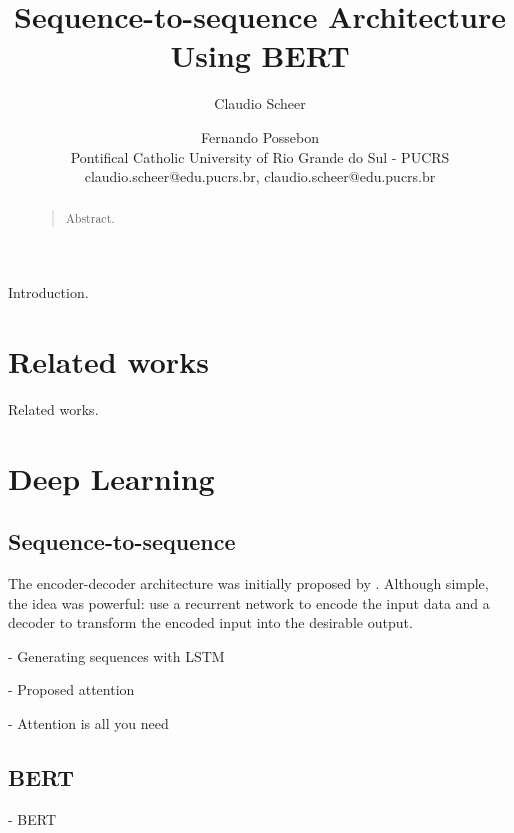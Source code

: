 \documentclass[letterpaper]{article}
\begin{document}
%
\title{Sequence-to-sequence Architecture\\Using BERT}
\author{Claudio Scheer \and Fernando Possebon\\
    Pontifical Catholic University of Rio Grande do Sul - PUCRS\\
    claudio.scheer@edu.pucrs.br,
    claudio.scheer@edu.pucrs.br
}

\maketitle

\begin{abstract}
\begin{quote}
Abstract.
\end{quote}
\end{abstract}

\noindent Introduction.


\section{Related works}
Related works.


\section{Deep Learning}

\subsection{Sequence-to-sequence}

The encoder-decoder architecture was initially proposed by \cite{DBLP:journals/corr/ChoMGBSB14}. Although simple, the idea was powerful: use a recurrent network to encode the input data and a decoder to transform the encoded input into the desirable output.

\cite{DBLP:journals/corr/Graves13} - Generating sequences with LSTM

\cite{DBLP:journals/corr/BahdanauCB14} - Proposed attention

\cite{DBLP:journals/corr/VaswaniSPUJGKP17} - Attention is all you need


\subsection{BERT}

\cite{DBLP:journals/corr/abs-1810-04805} - BERT
\end{document}
